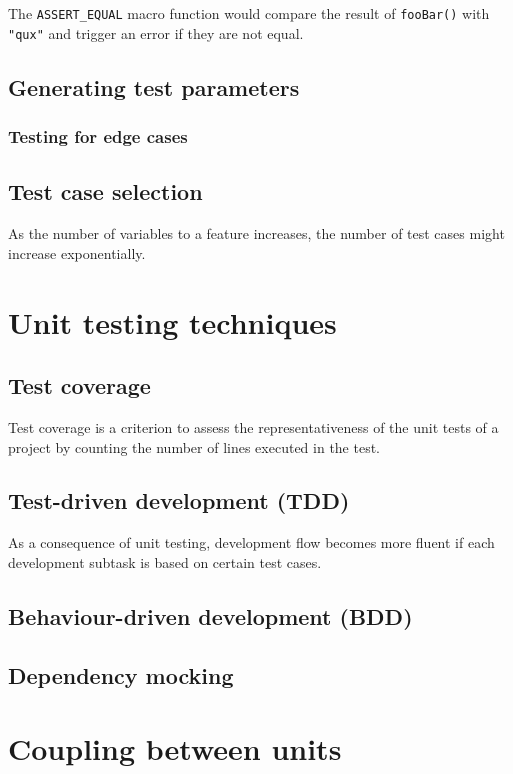 \documentclass{article}
\begin{document}
The \texttt{ASSERT\_EQUAL} macro function would compare the result of \texttt{fooBar()} with \texttt{"qux"} and trigger an error if they are not equal.

\subsection{Generating test parameters}

\subsubsection{Testing for edge cases}

\subsection{Test case selection}
As the number of variables to a feature increases, the number of test cases might increase exponentially.

\section{Unit testing techniques}
\subsection{Test coverage}
Test coverage is a criterion to assess the representativeness of the unit tests of a project by counting the number of lines executed in the test.


\subsection{Test-driven development (TDD)}
As a consequence of unit testing, development flow becomes more fluent if each development subtask is based on certain test cases.

\subsection{Behaviour-driven development (BDD)}


\subsection{Dependency mocking}

\section{Coupling between units}
\end{document}
